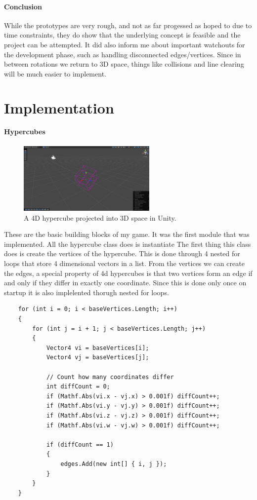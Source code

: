 \documentclass{article}
\begin{document}
\paragraph{Conclusion}
While the prototypes are very rough, and not as far progessed as hoped to due to time constraints, they do show that the underlying concept is feasible and the project can be attempted. It did also inform me about important watchouts for the development phase, such as handling disconnected edges/vertices. Since in between rotations we return to 3D space, things like collisions and line clearing will be much easier to implement.

\section{Implementation}
\paragraph{Hypercubes}
\begin{figure}
    \label{fig:hypercube}
    \centering
    \includegraphics[width=0.6\textwidth]{./Dev/HyperCube1.png}
    \caption{A 4D hypercube projected into 3D space in Unity.}
\end{figure}
These are the basic building blocks of my game. It was the first module that was implemented. All the hypercube class does is instantiate 
The first thing this class does is create the vertices of the hypercube. This is done through 4 nested for loops that store 4 dimensional vectors in a list. 
From the vertices we can create the edges, a special property of 4d hypercubes is that two vertices form an edge if and only if they differ in exactly one coordinate. Since this is done only once on startup it is also implelented thorugh nested for loops.
\begin{verbatim}
    for (int i = 0; i < baseVertices.Length; i++)
    {
        for (int j = i + 1; j < baseVertices.Length; j++)
        {
            Vector4 vi = baseVertices[i];
            Vector4 vj = baseVertices[j];

            // Count how many coordinates differ
            int diffCount = 0;
            if (Mathf.Abs(vi.x - vj.x) > 0.001f) diffCount++;
            if (Mathf.Abs(vi.y - vj.y) > 0.001f) diffCount++;
            if (Mathf.Abs(vi.z - vj.z) > 0.001f) diffCount++;
            if (Mathf.Abs(vi.w - vj.w) > 0.001f) diffCount++;

            if (diffCount == 1)
            {
                edges.Add(new int[] { i, j });
            }
        }
    }
\end{verbatim}
\end{document}

